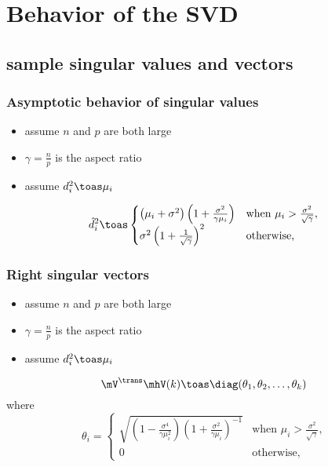 \documentclass[14pt]{beamer}
\begin{document}
\section{Behavior of the SVD}

\subsection{sample singular values and vectors}

\begin{frame}
  \frametitle{Asymptotic behavior of singular values}
  \begin{itemize}
  \item assume $n$ and $p$ are both large
  \item $\gamma = \frac{n}{p}$ is the aspect ratio
  \item assume $d_i^2 \toas \mu_i$
  \end{itemize} 
  \begin{theorem}
    \[
      \hat d_i^2
      \toas
        \begin{cases}
            \left( \mu_i + \sigma^2 \right)
            \left( 1 + \frac{\sigma^2}{\gamma \mu_i} \right)
                &\text{when $\mu_i > \frac{\sigma^2}{\sqrt{\gamma}}$}, \\
            \sigma^2 \left( 1 + \frac{1}{\sqrt{\gamma}} \right)^2
                &\text{otherwise,}
        \end{cases}
    \]
  \end{theorem} 
\end{frame}

\begin{frame}
  \frametitle{Right singular vectors}
  \begin{itemize}
  \item assume $n$ and $p$ are both large
  \item $\gamma = \frac{n}{p}$ is the aspect ratio
  \item assume $d_i^2 \toas \mu_i$
  \end{itemize}
  \begin{theorem}
    \[
      \mV^\trans \mhV(k)
      \toas
      \diag(\theta_1, \theta_2, \ldots, \theta_k)
    \]
    where
    \[
       \theta_i =  \begin{cases}
            \sqrt{ 
                \left( 1 - \frac{\sigma^4}{ \gamma \mu_i^2} \right) 
                \left( 1 + \frac{\sigma^2}{ \gamma \mu_i  } \right)^{-1} }
            &\text{when $\mu_i > \frac{\sigma^2}{\sqrt{\gamma}}$,} \\
            0
            &\text{otherwise,}
        \end{cases} 
    \]
  \end{theorem}
\end{frame}
\end{document}
